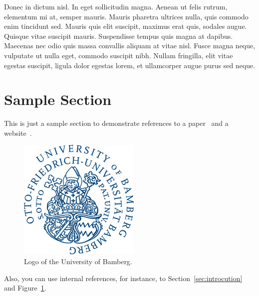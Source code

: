 \documentclass{article}
\begin{document}
Donec in dictum nisl. In eget sollicitudin magna. Aenean ut felis rutrum, elementum mi at, semper mauris. Mauris pharetra ultrices nulla, quis commodo enim tincidunt sed. Mauris quis elit suscipit, maximus erat quis, sodales augue. Quisque vitae suscipit mauris. Suspendisse tempus quis magna at dapibus. Maecenas nec odio quis massa convallis aliquam at vitae nisl. Fusce magna neque, vulputate ut nulla eget, commodo suscipit nibh. Nullam fringilla, elit vitae egestas suscipit, ligula dolor egestas lorem, et ullamcorper augue purus sed neque. 

\section{Sample Section}

This is just a sample section to demonstrate references to a paper~\cite{Shneiderman1996Eyes} and a website~\cite{wiki:BibTeX}.

\begin{figure}[tbp]
  \centering
  \includegraphics[width=0.3\linewidth]{figures/uni_ba_logo.png}
  \caption{Logo of the University of Bamberg.}
  \label{fig:uni_ba_logo}
\end{figure}

Also, you can use internal references, for instance, to Section~\ref{sec:introcution} and Figure~\ref{fig:uni_ba_logo}.



\printbibliography
\end{document}
